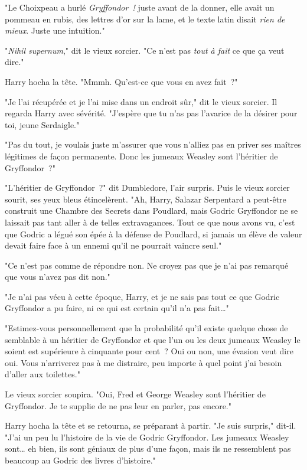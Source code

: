"Le Choixpeau a hurlé \emph{Gryffondor~!} juste avant de la donner, elle avait un pommeau en rubis, des lettres d'or sur la lame, et le texte latin disait \emph{rien de mieux}. Juste une intuition."

"\emph{Nihil supernum}," dit le vieux sorcier. "Ce n'est pas \emph{tout à fait} ce que ça veut dire."

Harry hocha la tête. "Mmmh. Qu'est-ce que vous en avez fait~?"

"Je l'ai récupérée et je l'ai mise dans un endroit sûr," dit le vieux sorcier. Il regarda Harry avec sévérité. "J'espère que tu n'as pas l'avarice de la désirer pour toi, jeune Serdaigle."

"Pas du tout, je voulais juste m'assurer que vous n'alliez pas en priver ses maîtres légitimes de façon permanente. Donc les jumeaux Weasley sont l'héritier de Gryffondor~?"

"L'héritier de Gryffondor~?" dit Dumbledore, l'air surpris. Puis le vieux sorcier sourit, ses yeux bleus étincelèrent. "Ah, Harry, Salazar Serpentard a peut-être construit une Chambre des Secrets dans Poudlard, mais Godric Gryffondor ne se laissait pas tant aller à de telles extravagances. Tout ce que nous avons vu, c'est que Godric a légué son épée à la défense de Poudlard, si jamais un élève de valeur devait faire face à un ennemi qu'il ne pourrait vaincre seul."

"Ce n'est pas comme de répondre non. Ne croyez pas que je n'ai pas remarqué que vous n'avez pas dit non."

"Je n'ai pas vécu à cette époque, Harry, et je ne sais pas tout ce que Godric Gryffondor a pu faire, ni ce qui est certain qu'il n'a pas fait…"

"Estimez-vous personnellement que la probabilité qu'il existe quelque chose de semblable à un héritier de Gryffondor et que l'un ou les deux jumeaux Weasley le soient est supérieure à cinquante pour cent~? Oui ou non, une évasion veut dire oui. Vous n'arriverez pas à me distraire, peu importe à quel point j'ai besoin d'aller aux toilettes."

Le vieux sorcier soupira. "Oui, Fred et George Weasley sont l'héritier de Gryffondor. Je te supplie de ne pas leur en parler, pas encore."

Harry hocha la tête et se retourna, se préparant à partir. "Je suis surpris," dit-il. "J'ai un peu lu l'histoire de la vie de Godric Gryffondor. Les jumeaux Weasley sont… eh bien, ils sont géniaux de plus d'une façon, mais ils ne ressemblent pas beaucoup au Godric des livres d'histoire."

